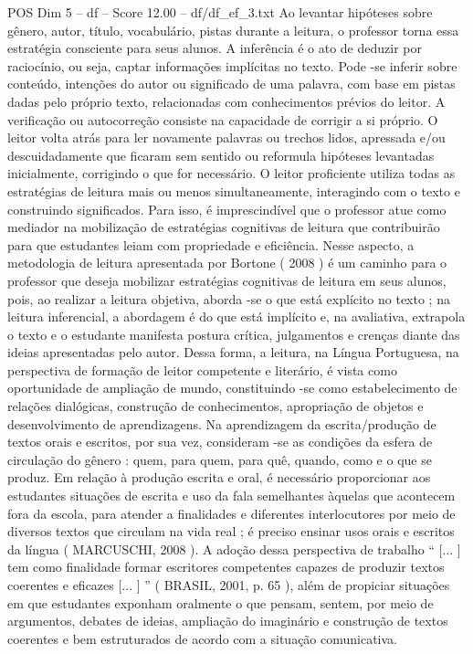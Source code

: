 \begin{textsample}{POS Dim 5 – df – Score 12.00 – df/df\_ef\_3.txt}
Ao levantar hipóteses sobre gênero, autor, título, vocabulário, pistas durante a leitura, o professor torna essa estratégia consciente para seus alunos.
A inferência é o ato de deduzir por raciocínio, ou seja, captar informações implícitas no texto.
Pode -se inferir sobre conteúdo, intenções do autor ou significado de uma palavra, com base em pistas dadas pelo próprio texto, relacionadas com conhecimentos prévios do leitor.
A verificação ou autocorreção consiste na capacidade de corrigir a si próprio.
O leitor volta atrás para ler novamente palavras ou trechos lidos, apressada e/ou descuidadamente que ficaram sem sentido ou reformula hipóteses levantadas inicialmente, corrigindo o que for necessário.
O leitor proficiente utiliza todas as estratégias de leitura mais ou menos simultaneamente, interagindo com o texto e construindo significados.
Para isso, é imprescindível que o professor atue como mediador na mobilização de estratégias cognitivas de leitura que contribuirão para que estudantes leiam com propriedade e eficiência.
Nesse aspecto, a metodologia de leitura apresentada por Bortone ( 2008 ) é um caminho para o professor que deseja mobilizar estratégias cognitivas de leitura em seus alunos, pois, ao realizar a leitura objetiva, aborda -se o que está explícito no texto ; na leitura inferencial, a abordagem é do que está implícito e, na avaliativa, extrapola o texto e o estudante manifesta postura crítica, julgamentos e crenças diante das ideias apresentadas pelo autor.
Dessa forma, a leitura, na Língua Portuguesa, na perspectiva de formação de leitor competente e literário, é vista como oportunidade de ampliação de mundo, constituindo -se como estabelecimento de relações dialógicas, construção de conhecimentos, apropriação de objetos e desenvolvimento de aprendizagens.
Na aprendizagem da escrita/produção de textos orais e escritos, por sua vez, consideram -se as condições da esfera de circulação do gênero : quem, para quem, para quê, quando, como e o que se produz.
Em relação à produção escrita e oral, é necessário proporcionar aos estudantes situações de escrita e uso da fala semelhantes àquelas que acontecem fora da escola, para atender a finalidades e diferentes interlocutores por meio de diversos textos que circulam na vida real ; é preciso ensinar usos orais e escritos da língua ( MARCUSCHI, 2008 ).
A adoção dessa perspectiva de trabalho “ [... ] tem como finalidade formar escritores competentes capazes de produzir textos coerentes e eficazes [... ] ” ( BRASIL, 2001, p. 65 ), além de propiciar situações em que estudantes exponham oralmente o que pensam, sentem, por meio de argumentos, debates de ideias, ampliação do imaginário e construção de textos coerentes e bem estruturados de acordo com a situação comunicativa.

\end{textsample}
